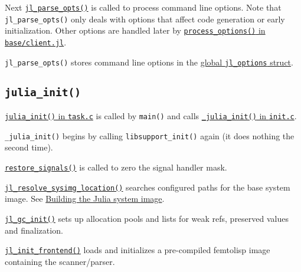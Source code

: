 Next \href{https://github.com/JuliaLang/julia/blob/master/src/jloptions.c}{\texttt{jl\_parse\_opts()}} is called to process command line options. Note that \texttt{jl\_parse\_opts()} only deals with options that affect code generation or early initialization. Other options are handled later by \href{https://github.com/JuliaLang/julia/blob/master/base/client.jl}{\texttt{process\_options()} in \texttt{base/client.jl}}.



\texttt{jl\_parse\_opts()} stores command line options in the \href{https://github.com/JuliaLang/julia/blob/master/src/julia.h}{global \texttt{jl\_options} struct}.



\hypertarget{10951200599627901176}{}


\subsection{\texttt{julia\_init()}}



\href{https://github.com/JuliaLang/julia/blob/master/src/task.c}{\texttt{julia\_init()} in \texttt{task.c}} is called by \texttt{main()} and calls \href{https://github.com/JuliaLang/julia/blob/master/src/init.c}{\texttt{\_julia\_init()} in \texttt{init.c}}.



\texttt{\_julia\_init()} begins by calling \texttt{libsupport\_init()} again (it does nothing the second time).



\href{https://github.com/JuliaLang/julia/blob/master/src/signals-unix.c}{\texttt{restore\_signals()}} is called to zero the signal handler mask.



\href{https://github.com/JuliaLang/julia/blob/master/src/init.c}{\texttt{jl\_resolve\_sysimg\_location()}} searches configured paths for the base system image. See \hyperlink{15513456349900674098}{Building the Julia system image}.



\href{https://github.com/JuliaLang/julia/blob/master/src/gc.c}{\texttt{jl\_gc\_init()}} sets up allocation pools and lists for weak refs, preserved values and finalization.



\href{https://github.com/JuliaLang/julia/blob/master/src/ast.c}{\texttt{jl\_init\_frontend()}} loads and initializes a pre-compiled femtolisp image containing the scanner/parser.



